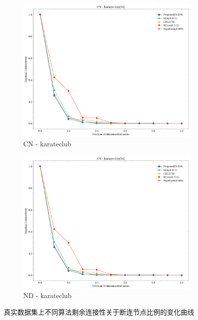\begin{figure}[htbp]
    \centering
    \begin{subfigure}{0.45\textwidth}
        \includegraphics[width=\linewidth]{ANC_CN_karateclub.png}
        \caption{CN - karateclub}
    \end{subfigure}%
    \hfill
    \begin{subfigure}{0.45\textwidth}
        \includegraphics[width=\linewidth]{ANC_CN_karateclub.png}
        \caption{ND - karateclub}
    \end{subfigure}%
    \caption{真实数据集上不同算法剩余连接性关于断连节点比例的变化曲线}
    \label{fig:真实数据集-ANCCurve}
\end{figure}
